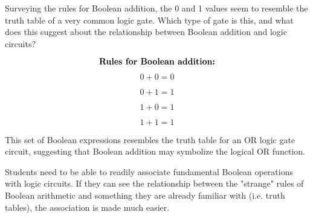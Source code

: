 

Surveying the rules for Boolean addition, the 0 and 1 values seem to resemble the truth table of a very common logic gate.  Which type of gate is this, and what does this suggest about the relationship between Boolean addition and logic circuits?

$$\hbox{\bf{Rules for Boolean addition:}}$$

$$0 + 0 = 0$$

$$0 + 1 = 1$$

$$1 + 0 = 1$$

$$1 + 1 = 1$$







This set of Boolean expressions resembles the truth table for an OR logic gate circuit, suggesting that Boolean addition may symbolize the logical OR function.







Students need to be able to readily associate fundamental Boolean operations with logic circuits.  If they can see the relationship between the "strange" rules of Boolean arithmetic and something they are already familiar with (i.e. truth tables), the association is made much easier.





